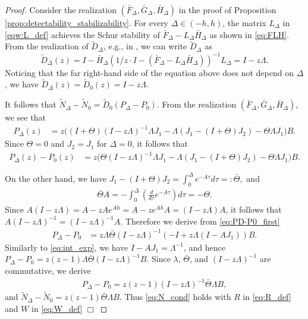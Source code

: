 \documentclass[letterpaper, 12pt, draftcls, onecolumn]{ieeeconf}
\begin{document}
\begin{proof}
	Consider the realization $(\bar F_{\Delta}, \bar G_{\Delta}, \bar H_{\Delta})$ in
	the proof of 
	Proposition \ref{prop:detectability_stabilizability}.
	For every $\Delta \in 
	(-h, h)$,
	the matrix $L_{\Delta}$ in \eqref{eqw:L_def}
	achieves the Schur stability of
	$\bar F_{\Delta}-L_{\Delta} \bar H_{\Delta}$ as shown in \eqref{eq:FLH}.
	From the realization of $\tilde D_{\Delta}$, e.g., in
	\cite[Theorem 4.2.1]{vidyasagar1985},
	we can write
	$\tilde D_{\Delta}$ as
	\begin{equation*}
	\tilde D_{\Delta}(z) = I - \bar H_{\Delta}
	(1/z\cdot I - (\bar F_{\Delta}-L_{\Delta} \bar H_{\Delta}))^{-1}L_{\Delta}
	=
	I - z\Lambda.
	\end{equation*}
Noticing that the far right-hand side of the equation above
	does not depend on $\Delta$,
	we have $\tilde D_{\Delta}(z) = \tilde D_{0}(z) = I - z\Lambda$.
	
	It follows that $\tilde N_{\Delta} - \tilde N_{0} = 
	\tilde D_0(P_{\Delta} - P_0)$. 
	From the realization $(\bar{F}_{\Delta}, \bar{G}_{\Delta}, \bar{H}_{\Delta})$,
	we see that
	\begin{align*}
	P_{\Delta}(z) &=
	z \bigl((I+\Theta) (I - z\Lambda)^{-1}\Lambda J_1 
	- \Lambda (J_1 - (I+\Theta)J_2)  - \Theta \Lambda J_1\bigr)B.
	\end{align*}
	Since $\Theta = 0$ and $J_2 = J_1$ for $\Delta = 0$,
	it follows that
\begin{align}
	P_{\Delta}(z) - P_0(z) &=
	z\bigr( 
	\Theta (I-z\Lambda)^{-1}\Lambda J_1 
	-\Lambda (J_1 - (I+\Theta)J_2) - \Theta\Lambda J_1
	\bigr)
	B.
	\label{eq:PD-P0_first}
	\end{align}
	
	On the other hand,
	we have
$
	J_1 - (I+\Theta)J_2 = 
\int^{\Delta}_0 e^{-A\tau} d\tau =: \bar \Theta,	
	$
and
	\begin{align}
	\label{eq:int_exp}
	\bar \Theta A = 
	-\int^{\Delta}_0 \left(\frac{d}{d\tau} e^{-A\tau}\right) d\tau
	= -\Theta.
	\end{align}
	Since $A(I-z\Lambda) = A-zAe^{Ah} = A-ze^{Ah}A = (I-z\Lambda)A$,
	it follows that $A(I-z\Lambda)^{-1} = (I-z\Lambda)^{-1}A$.
	Therefore we derive from \eqref{eq:PD-P0_first}
	\begin{align*}
	P_{\Delta} - P_0 &=
z\Lambda \bar \Theta
	(I-z\Lambda)^{-1}
	\left(
	-I + 
	z\Lambda(I-AJ_1)
	\right)B.
	\end{align*}
	Similarly to \eqref{eq:int_exp}, we have
	$I-AJ_1 = \Lambda^{-1}$,
and hence
$P_{\Delta} - P_0 =
	z(z-1)\Lambda \bar \Theta (I-z\Lambda) ^{-1}B.
	$
Since $\lambda$, $\bar\Theta$, and $(I-z\Lambda)^{-1}$
	are commutative, we derive 
	\begin{align*}
	P_{\Delta} - P_0 =
	z(z-1)
	(I-z\Lambda) ^{-1}
	\bar \Theta\Lambda  B,
	\end{align*}
	and 
$
	\tilde N_{\Delta} - \tilde N_0
	=
	z(z-1)
	\bar \Theta \Lambda B.
	$
Thus \eqref{eq:N_cond} holds with
	$R$ in \eqref{eq:R_def} and
	$W$ in \eqref{eq:W_def}
	\hspace*{\fill} $\Box$ 
\end{proof}
\end{document}
